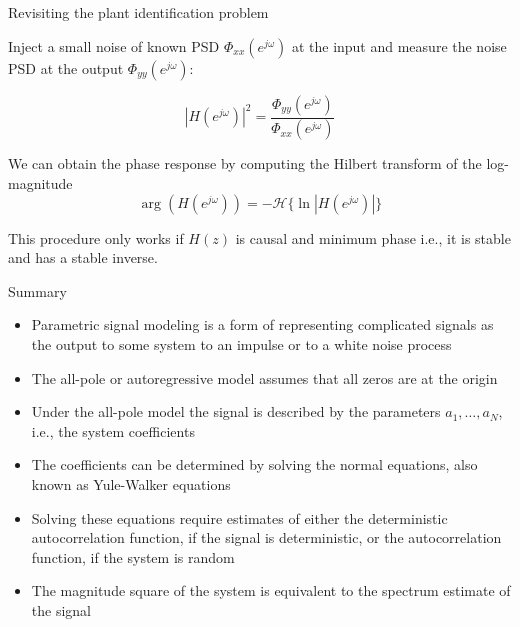 \documentclass[10pt]{beamer}
\begin{document}
\begin{frame}{Revisiting the plant identification problem}
	
\begin{center}
\end{center}

Inject a small noise of known PSD $\Phi_{xx}(e^{j\omega})$ at the input and measure the noise PSD at the output $\Phi_{yy}(e^{j\omega})$:

\begin{equation*}
|H(e^{j\omega})|^2 = \frac{\Phi_{yy}(e^{j\omega})}{\Phi_{xx}(e^{j\omega})} \tag{only know the magnitude}
\end{equation*}

We can obtain the phase response by computing the Hilbert transform of the log-magnitude
\begin{equation*}
\arg(H(e^{j\omega})) = -\mathcal{H}\{\ln |H(e^{j\omega})|\}
\end{equation*}

This procedure only works if $H(z)$ is causal and minimum phase i.e., it is stable and has a stable inverse.

\end{frame}

%
\begin{frame}{Summary}
	\begin{itemize}
		\item Parametric signal modeling is a form of representing complicated signals as the output to some system to an impulse or to a white noise process
		\item The all-pole or autoregressive model assumes that all zeros are at the origin
		\item Under the all-pole model the signal is described by the parameters $a_1, \ldots, a_N$, i.e., the system coefficients
		\item The coefficients can be determined by solving the normal equations, also known as Yule-Walker equations
		\item Solving these equations require estimates of either the deterministic autocorrelation function, if the signal is deterministic, or the autocorrelation function, if the system is random
		\item The magnitude square of the system is equivalent to the spectrum estimate of the signal
	\end{itemize}
\end{frame}
\end{document}
